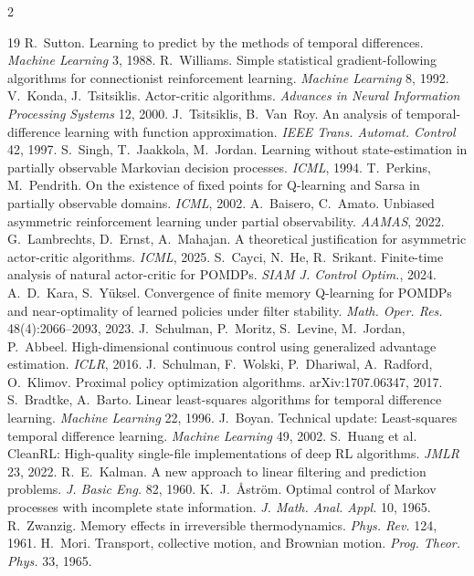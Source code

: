 \documentclass[11pt]{article}
\begin{document}
\scriptsize\setlength{\itemsep}{0pt}\setlength{\parskip}{1pt}\raggedright
\begin{multicols}{2}
\begin{thebibliography}{19}
 R.~Sutton. Learning to predict by the methods of temporal differences.
\emph{Machine Learning} 3, 1988.
 R.~Williams. Simple statistical gradient-following algorithms for
connectionist reinforcement learning. \emph{Machine Learning} 8, 1992.
 V.~Konda, J.~Tsitsiklis. Actor-critic algorithms.
\emph{Advances in Neural Information Processing Systems} 12, 2000.
 J.~Tsitsiklis, B.~Van~Roy. An analysis of temporal-difference learning with
function approximation. \emph{IEEE Trans. Automat. Control} 42, 1997.
 S.~Singh, T.~Jaakkola, M.~Jordan. Learning without state-estimation in
partially observable Markovian decision processes. \emph{ICML}, 1994.
 T.~Perkins, M.~Pendrith. On the existence of fixed points for Q-learning
and Sarsa in partially observable domains. \emph{ICML}, 2002.
 A.~Baisero, C.~Amato. Unbiased asymmetric reinforcement learning under
partial observability. \emph{AAMAS}, 2022.
 G.~Lambrechts, D.~Ernst, A.~Mahajan. A theoretical justification for
asymmetric actor-critic algorithms. \emph{ICML}, 2025.
 S.~Cayci, N.~He, R.~Srikant. Finite-time analysis of natural actor-critic for
POMDPs. \emph{SIAM J. Control Optim.}, 2024.
 A.~D.~Kara, S.~Y\"uksel. Convergence of finite memory Q-learning for POMDPs and
near-optimality of learned policies under filter stability. \emph{Math. Oper. Res.}
48(4):2066--2093, 2023.
 J.~Schulman, P.~Moritz, S.~Levine, M.~Jordan, P.~Abbeel. High-dimensional
continuous control using generalized advantage estimation. \emph{ICLR}, 2016.
 J.~Schulman, F.~Wolski, P.~Dhariwal, A.~Radford, O.~Klimov. Proximal policy
optimization algorithms. arXiv:1707.06347, 2017.
 S.~Bradtke, A.~Barto. Linear least-squares algorithms for temporal difference
learning. \emph{Machine Learning} 22, 1996.
 J.~Boyan. Technical update: Least-squares temporal difference learning.
\emph{Machine Learning} 49, 2002.
 S.~Huang et al. CleanRL: High-quality single-file implementations of deep
RL algorithms. \emph{JMLR} 23, 2022.
 R.~E.~Kalman. A new approach to linear filtering and prediction problems.
\emph{J. Basic Eng.} 82, 1960.
 K.~J.~\AA str\"om. Optimal control of Markov processes with incomplete state
information. \emph{J. Math. Anal. Appl.} 10, 1965.
 R.~Zwanzig. Memory effects in irreversible thermodynamics.
\emph{Phys. Rev.} 124, 1961.
 H.~Mori. Transport, collective motion, and Brownian motion.
\emph{Prog. Theor. Phys.} 33, 1965.
\end{thebibliography}
\end{multicols}
\end{document}
